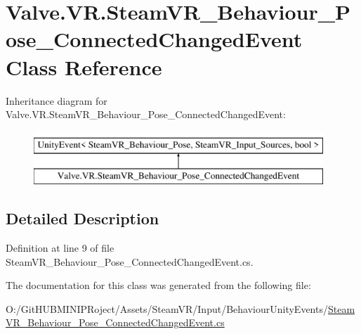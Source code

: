 \hypertarget{class_valve_1_1_v_r_1_1_steam_v_r___behaviour___pose___connected_changed_event}{}\section{Valve.\+V\+R.\+Steam\+V\+R\+\_\+\+Behaviour\+\_\+\+Pose\+\_\+\+Connected\+Changed\+Event Class Reference}
\label{class_valve_1_1_v_r_1_1_steam_v_r___behaviour___pose___connected_changed_event}
Inheritance diagram for Valve.\+V\+R.\+Steam\+V\+R\+\_\+\+Behaviour\+\_\+\+Pose\+\_\+\+Connected\+Changed\+Event\+:\begin{figure}[H]
\begin{center}
\leavevmode
\includegraphics[height=2.000000cm]{class_valve_1_1_v_r_1_1_steam_v_r___behaviour___pose___connected_changed_event}
\end{center}
\end{figure}


\subsection{Detailed Description}


Definition at line 9 of file Steam\+V\+R\+\_\+\+Behaviour\+\_\+\+Pose\+\_\+\+Connected\+Changed\+Event.\+cs.



The documentation for this class was generated from the following file\+:\begin{DoxyCompactItemize}
\item 
O\+:/\+Git\+H\+U\+B\+M\+I\+N\+I\+P\+Roject/\+Assets/\+Steam\+V\+R/\+Input/\+Behaviour\+Unity\+Events/\mbox{\hyperlink{_steam_v_r___behaviour___pose___connected_changed_event_8cs}{Steam\+V\+R\+\_\+\+Behaviour\+\_\+\+Pose\+\_\+\+Connected\+Changed\+Event.\+cs}}\end{DoxyCompactItemize}
